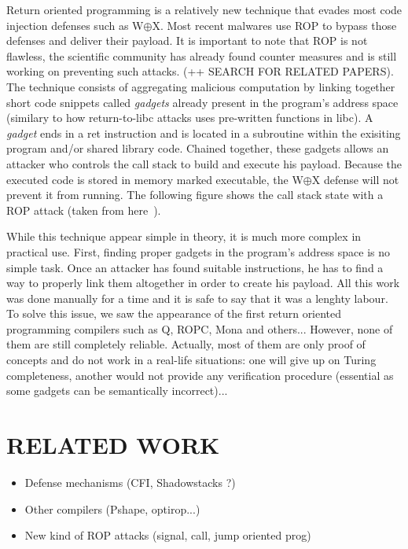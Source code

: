 \documentclass[10pt,twocolumn]{article}
\begin{document}
Return oriented programming is a relatively new technique that evades most code
injection defenses such as W$\oplus$X. Most recent malwares use ROP to bypass
those defenses and deliver their payload. It is important to note that ROP is
not flawless, the scientific community has already found counter measures and
is still working on preventing such attacks. (++ SEARCH FOR RELATED PAPERS).
The technique consists of aggregating malicious computation by linking together
short code snippets called \textit{gadgets} already present in the program's
address space (similary to how return-to-libc attacks uses pre-written
functions in libc).  A \textit{gadget} ends in a ret instruction and is located
in a subroutine within the exisiting program and/or shared library code.
Chained together, these gadgets allows an attacker who controls the call stack
to build and execute his payload. Because the executed code is stored in memory
marked executable, the W$\oplus$X defense will not prevent it from running. The
following figure shows the call stack state with a ROP attack (taken from
here~\cite{bletsch_jump-oriented_2011}).

While this technique appear simple in theory, it is much more complex in
practical use. First, finding proper gadgets in the program's address space is
no simple task. Once an attacker has found suitable instructions, he has to
find a way to properly link them altogether in order to create his payload. All
this work was done manually for a time and it is safe to say that it was a
lenghty labour. To solve this issue, we saw the appearance of the first return
oriented programming compilers such as Q, ROPC, Mona and others... However,
none of them are still completely reliable. Actually, most of them are only
proof of concepts and do not work in a real-life situations: one will give up
on Turing completeness, another would not provide any verification procedure
(essential as some gadgets can be semantically incorrect)...


\section{RELATED WORK}
\begin{itemize}
    \item Defense mechanisms (CFI, Shadowstacks ?)
    \item Other compilers (Pshape, optirop...)
    \item New kind of ROP attacks (signal, call, jump oriented prog)
\end{itemize}
\end{document}
